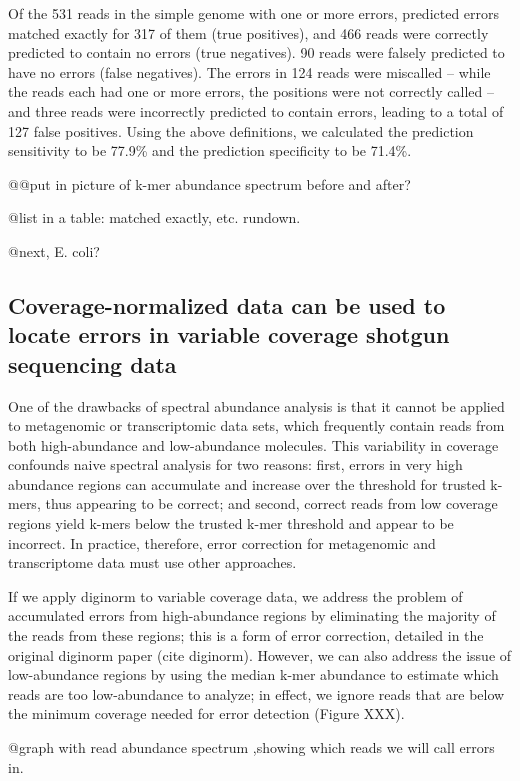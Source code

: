 Of the 531 reads in the simple genome with one or more errors,
predicted errors matched exactly for 317 of them (true positives), and
466 reads were correctly predicted to contain no errors (true
negatives). 90 reads were falsely predicted to have no errors (false
negatives). The errors in 124 reads were miscalled -- while the reads
each had one or more errors, the positions were not correctly called
-- and three reads were incorrectly predicted to contain errors,
leading to a total of 127 false positives.  Using the above
definitions, we calculated the prediction sensitivity to be 77.9\% and
the prediction specificity to be 71.4\%.

@@put in picture of k-mer abundance spectrum before and after?

@list in a table: matched exactly, etc. rundown.

@next, E. coli?

\subsection{Coverage-normalized data can be used to locate errors in variable
coverage shotgun sequencing data}

One of the drawbacks of spectral abundance analysis is that it cannot
be applied to metagenomic or transcriptomic data sets, which
frequently contain reads from both high-abundance and low-abundance
molecules.  This variability in coverage confounds naive spectral
analysis for two reasons: first, errors in very high abundance regions
can accumulate and increase over the threshold for trusted k-mers,
thus appearing to be correct; and second, correct reads from low
coverage regions yield k-mers below the trusted k-mer threshold and
appear to be incorrect.  In practice, therefore, error correction for
metagenomic and transcriptome data must use other approaches.

If we apply diginorm to variable coverage data, we address the problem
of accumulated errors from high-abundance regions by eliminating the
majority of the reads from these regions; this is a form of error
correction, detailed in the original diginorm paper (cite diginorm).
However, we can also address the issue of low-abundance regions by
using the median k-mer abundance to estimate which reads are too
low-abundance to analyze; in effect, we ignore reads that are
below the minimum coverage needed for error detection (Figure XXX).

@graph with read abundance spectrum ,showing which reads we will
call errors in.

